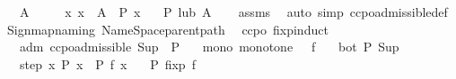 \begin{isabellebody}
\ \ \ {\isachardoublequoteopen}A\ {\isasymnoteq}\ {\isacharbraceleft}{\kern0pt}{\isacharbraceright}{\kern0pt}{\isachardoublequoteclose}\isanewline
\ \ \ {\isachardoublequoteopen}{\isasymAnd}x{\isachardot}{\kern0pt}\ x\ {\isasymin}\ A\ {\isasymLongrightarrow}\ P\ x{\isachardoublequoteclose}\isanewline
\ \ \ {\isachardoublequoteopen}P\ {\isacharparenleft}{\kern0pt}lub\ A{\isacharparenright}{\kern0pt}{\isachardoublequoteclose}\isanewline
%
\isadelimproof
\ \ %
\endisadelimproof
%
\isatagproof
{}\isamarkupfalse%
\ assms\ \isamarkupfalse%
\ {\isacharparenleft}{\kern0pt}auto\ simp{\isacharcolon}{\kern0pt}\ ccpo{\isachardot}{\kern0pt}admissible{\isacharunderscore}{\kern0pt}def{\isacharparenright}{\kern0pt}%
\endisatagproof
{\isafoldproof}%
%
\isadelimproof
\isanewline
%
\endisadelimproof
%
\isadelimML
\isanewline
%
\endisadelimML
%
\isatagML
{}\isamarkupfalse%
\ {\isacartoucheopen}Sign{\isachardot}{\kern0pt}map{\isacharunderscore}{\kern0pt}naming\ Name{\isacharunderscore}{\kern0pt}Space{\isachardot}{\kern0pt}parent{\isacharunderscore}{\kern0pt}path{\isacartoucheclose}%
\endisatagML
{\isafoldML}%
%
\isadelimML
\isanewline
%
\endisadelimML
\isanewline
{}\isamarkupfalse%
\ {\isacharparenleft}{\kern0pt}\ ccpo{\isacharparenright}{\kern0pt}\ fixp{\isacharunderscore}{\kern0pt}induct{\isacharcolon}{\kern0pt}\isanewline
\ \ \ adm{\isacharcolon}{\kern0pt}\ {\isachardoublequoteopen}ccpo{\isachardot}{\kern0pt}admissible\ Sup\ {\isacharparenleft}{\kern0pt}{\isasymle}{\isacharparenright}{\kern0pt}\ P{\isachardoublequoteclose}\isanewline
\ \ \ mono{\isacharcolon}{\kern0pt}\ {\isachardoublequoteopen}monotone\ {\isacharparenleft}{\kern0pt}{\isasymle}{\isacharparenright}{\kern0pt}\ {\isacharparenleft}{\kern0pt}{\isasymle}{\isacharparenright}{\kern0pt}\ f{\isachardoublequoteclose}\isanewline
\ \ \ bot{\isacharcolon}{\kern0pt}\ {\isachardoublequoteopen}P\ {\isacharparenleft}{\kern0pt}Sup\ {\isacharbraceleft}{\kern0pt}{\isacharbraceright}{\kern0pt}{\isacharparenright}{\kern0pt}{\isachardoublequoteclose}\isanewline
\ \ \ step{\isacharcolon}{\kern0pt}\ {\isachardoublequoteopen}{\isasymAnd}x{\isachardot}{\kern0pt}\ P\ x\ {\isasymLongrightarrow}\ P\ {\isacharparenleft}{\kern0pt}f\ x{\isacharparenright}{\kern0pt}{\isachardoublequoteclose}\isanewline
\ \ \ {\isachardoublequoteopen}P\ {\isacharparenleft}{\kern0pt}fixp\ f{\isacharparenright}{\kern0pt}{\isachardoublequoteclose}\isanewline

\end{isabellebody}
